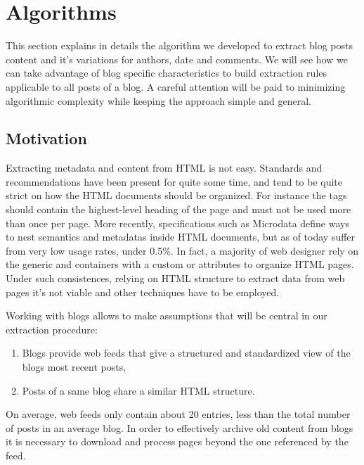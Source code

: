 \section{Algorithms}

This section explains in details the algorithm we developed to extract blog posts content and it's variations for authors, date and comments. We will see how we can take advantage of blog specific characteristics to build extraction rules applicable to all posts of a blog. A careful attention will be paid to minimizing algorithmic complexity while keeping the approach simple and general.


\subsection{Motivation}
Extracting metadata and content from HTML is not easy. Standards and recommendations have been present for quite some time, and tend to be quite strict on how the HTML documents should be organized. For instance the  tags should contain the highest-level heading of the page and must not be used more than once per page\cite{w3c2002}. More recently, specifications such as Microdata\cite{whatwg2013} define ways to nest semantics and metadatas inside HTML documents, but as of today suffer from very low usage rates, under 0.5\%\cite{andrewrogers2013}. In fact, a majority of web designer rely on the generic  and  containers with a custom  or  attributes to organize HTML pages. Under such consistences, relying on HTML structure to extract data from web pages it's not viable and other techniques have to be employed.


Working with blogs allows to make assumptions that will be central in our extraction procedure:
\begin{enumerate}[label={(\arabic*)}]
  \item \label{havefeed} Blogs provide web feeds that give a structured and standardized view of the blogs most recent posts,
  \item \label{similarhtml} Posts of a same blog share a similar HTML structure.
\end{enumerate}
On average, web feeds only contain about 20 entries\cite{oita2010}, less than the total number of posts in an average blog. In order to effectively archive old content from blogs it is necessary to download and process pages beyond the one referenced by the feed.


